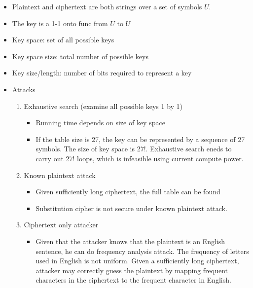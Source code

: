 \documentclass[landscape,a4paper]{extarticle}
\begin{document}
\begin{multicols*}{5}
    \begin{itemize}
        \item Plaintext and ciphertext are both strings over a set of symbols $U$.
        \item The key is a 1-1 onto func from $U$ to $U$
        \item Key space: set of all possible keys
        \item Key space size: total number of possible keys
        \item Key size/length: number of bits required to represent a key
        \item Attacks
        \begin{enumerate}
            \item Exhaustive search (examine all possible keys 1 by 1)
            \begin{itemize}
                \item Running time depends on size of key space
                \item If the table size is 27, the key can be represented by a sequence of 27
                symbols. The size of key space is 27!. Exhaustive search eneds to carry out 27!
                loops, which is infeasible using current compute power.
            \end{itemize}
            \item Known plaintext attack
            \begin{itemize}
                \item Given sufficiently long ciphertext, the full table can be found
                \item Substitution cipher is not secure under known plaintext attack.
            \end{itemize}
            \item Ciphertext only attacker
            \begin{itemize}
                \item Given that the attacker knows that the plaintext is an English sentence,
                he can do frequency analysis attack. The frequency of letters used in English is 
                not uniform. Given a sufficiently long ciphertext, attacker may correctly guess the plaintext by 
                mapping frequent characters in the ciphertext to the frequent character in English.
            \end{itemize}
        \end{enumerate}
    \end{itemize}


\end{multicols*}
\end{document}
